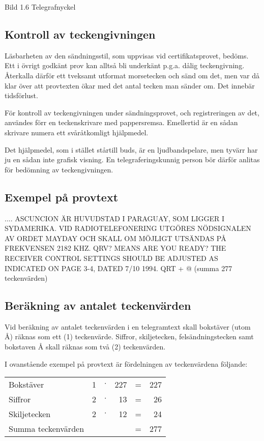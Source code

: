 Bild 1.6 Telegrafnyckel

\subsection{Kontroll av teckengivningen}

Läsbarheten av den sändningsstil, som uppvisas vid certifikatsprovet,
bedöms. Ett i övrigt godkänt prov kan alltså bli underkänt p.g.a. dålig
teckengivning. Återkalla därför ett tveksamt utformat morsetecken och sänd om
det, men var då klar över att provtexten ökar med det antal tecken man sänder
om. Det innebär tidsförlust.

För kontroll av teckengivningen under sändningsprovet, och registreringen av
det, användes förr en teckenskrivare med pappersremsa. Emellertid är en sådan
skrivare numera ett svåråtkomligt hjälpmedel.

Det hjälpmedel, som i stället stårtill buds, är en ljudbandspelare, men tyvärr
har ju en sådan inte grafisk visning. En telegraferingskunnig person bör därför
anlitas för bedömning av teckengivningen.

\subsection{Exempel på provtext}

.... ASCUNCION ÄR HUVUDSTAD I PARAGUAY, SOM LIGGER I SYDAMERIKA.  VID
RADIOTELEFONERING UTGÖRES NÖDSIGNALEN AV ORDET MAYDAY OCH SKALL OM MÖJLIGT
UTSÄNDAS PÅ FREKVENSEN 2182 KHZ. QRV? MEANS ARE YOU READY? THE RECEIVER CONTROL
SETTINGS SHOULD BE ADJUSTED AS INDICATED ON PAGE 3-4, DATED 7/10 1994. QRT + @
(summa 277 teckenvärden)

\subsection{Beräkning av antalet teckenvärden}

Vid beräkning av antalet teckenvärden i en telegramtext skall bokstäver (utom Å)
räknas som ett (1) teckenvärde. Siffror, skiljetecken, felsändningstecken samt
bokstaven Å skall räknas som två (2) teckenvärden.

I ovanstående exempel på provtext är fördelningen av teckenvärdena följande:

\begin{tabular}{lrcrcr}
Bokstäver          & 1 & $\cdot$ & 227 & = & 227 \\
Siffror            & 2 & $\cdot$ & 13  & = & 26  \\
Skiljetecken       & 2 & $\cdot$ & 12  & = & 24  \\
Summa teckenvärden &   &         &     & = & 277
\end{tabular}

